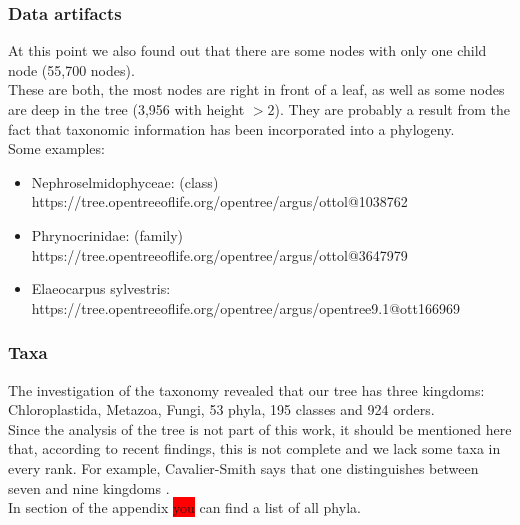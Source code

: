       \subsubsection{Data artifacts}
        At this point we also found out that there are some nodes with only one child node (55,700 nodes). \\
        These are both, the most nodes are right in front of a leaf, as well as some nodes are deep in the 
          tree (3,956 with height $>2$). They are probably a result from the fact that taxonomic information 
          has been incorporated into a phylogeny. \\
        Some examples:
        \begin{itemize}
          \item Nephroselmidophyceae: (class) \\
            https://tree.opentreeoflife.org/opentree/argus/ottol@1038762
          \item Phrynocrinidae: (family) \\
            https://tree.opentreeoflife.org/opentree/argus/ottol@3647979
          \item Elaeocarpus sylvestris: \\
            https://tree.opentreeoflife.org/opentree/argus/opentree9.1@ott166969
        \end{itemize}

      \subsubsection{Taxa}
        The investigation of the taxonomy revealed that our tree has three kingdoms: Chloroplastida, 
          Metazoa, Fungi, 53 phyla, 195 classes and 924 orders. \\
        Since the analysis of the tree is not part of this work, it should be mentioned here that, 
          according to recent findings, this is not complete and we lack some taxa in every rank. For 
          example, Cavalier-Smith says that one distinguishes between seven and nine kingdoms 
          \cite{CavalierSmith1981}. \\
        In section \pageref{subsec:listPhyla} of the appendix \colorbox{red}{you} can find a list of all phyla.

